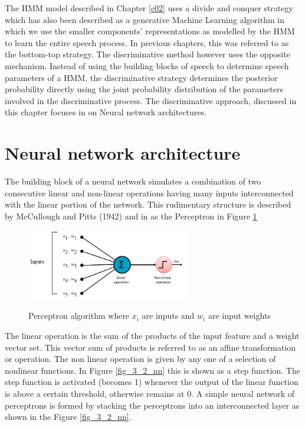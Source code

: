 The HMM model described in Chapter \ref{c02} uses a divide and conquer strategy which has also been described as a generative Machine Learning algorithm in which we use the smaller components’ representations as modelled by the HMM to learn the entire speech process.   In previous chapters, this was referred to as the bottom-top strategy.  The discriminative method however uses the opposite mechanism.  Instead of using the building blocks of speech to determine speech parameters of a HMM, the discriminative strategy determines the posterior probability directly using the joint probability distribution of the parameters involved in the discriminative process.  The discriminative approach, discussed in this chapter focuses in on Neural network architectures.

\section{Neural network architecture}

The building block of a neural network simulates a combination of two consecutive linear and non-linear operations having many inputs interconnected with the linear portion of the network.  This rudimentary structure is described by McCullough and Pitts (1942) and in  \cite{cowan1990discussion} as the Perceptron in Figure \ref{fig_3_1_ptron} 

\begin{figure}
\centering
  \includegraphics[width=7cm]{thesis/images/ptron2.png}\\
  \caption{Perceptron algorithm where $x_i$ are inputs and $w_i$ are input weights} \label{fig_3_1_ptron}
\end{figure}

The linear operation is the sum of the products of the input feature and a  weight vector set.  This vector sum of products is referred to as an affine transformation or operation.  The non linear operation is given by any one of a selection of nonlinear functions.  In  Figure \ref{fig_3_2_nn} this is shown as a step function.  The step function is activated (becomes 1) whenever the output of the linear function is above a certain threshold, otherwise remains at 0.  A simple neural network of perceptrons is formed by stacking the perceptrons into an interconnected layer as shown in the Figure \ref{fig_3_2_nn}.

